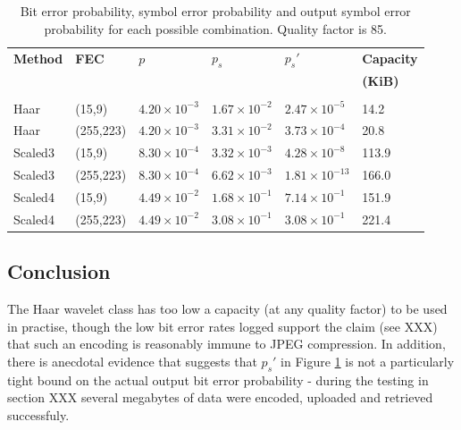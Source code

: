 \begin{table}[tbph]
  \begin{center}
        \begin{tabular}{l l l l l l}
            
            \textbf{Method} & \textbf{FEC} & \textbf{$p$} & \textbf{$p_s$} & \textbf{$p_s'$} & \textbf{Capacity} \\  & &  &  &  & \textbf{(KiB)} \\[0.1ex] \hline \\ [-1.5ex]

            Haar & (15,9) & $4.20 \times 10^{-3}$ & $1.67 \times 10^{-2}$ & $2.47 \times 10^{-5}$ & 14.2 \\
            Haar &  (255,223) & $4.20 \times 10^{-3}$ & $3.31 \times 10^{-2}$ & $3.73 \times 10^{-4}$ & 20.8 \\
            Scaled3 & (15,9) & $8.30 \times 10^{-4}$ & $3.32 \times 10^{-3}$ & $4.28 \times 10^{-8}
$ & 113.9 \\
            \rowcolor{green!50!white} Scaled3 & (255,223) & $8.30 \times 10^{-4}$ & $6.62 \times 10^{-3}$ & $1.81 \times 10^{-13}
$ & 166.0 \\
            Scaled4 & (15,9) & $4.49 \times 10^{-2}$ & $1.68 \times 10^{-1}$ & $7.14 \times 10^{-1}$ & 151.9 \\
            Scaled4 & (255,223) & $4.49 \times 10^{-2}$ & $3.08 \times 10^{-1}$ & $3.08
 \times 10^{-1}$ & 221.4 \\
            
        \end{tabular}
        \caption{Bit error probability, symbol error probability and output symbol error probability for each possible combination. Quality factor is 85.}
        \label{tab:fec}
    \end{center}
\end{table}


\subsection{Conclusion}
\label{ssec:image-conc}

The Haar wavelet class has too low a capacity (at any quality factor) to be used in practise, though the low bit error rates logged support the claim (see XXX) that such an encoding is reasonably immune to JPEG compression. In addition, there is anecdotal evidence that suggests that $p_s'$ in Figure \ref{tab:fec} is not a particularly tight bound on the actual output bit error probability - during the testing in section XXX several megabytes of data were encoded, uploaded and retrieved successfuly. 

